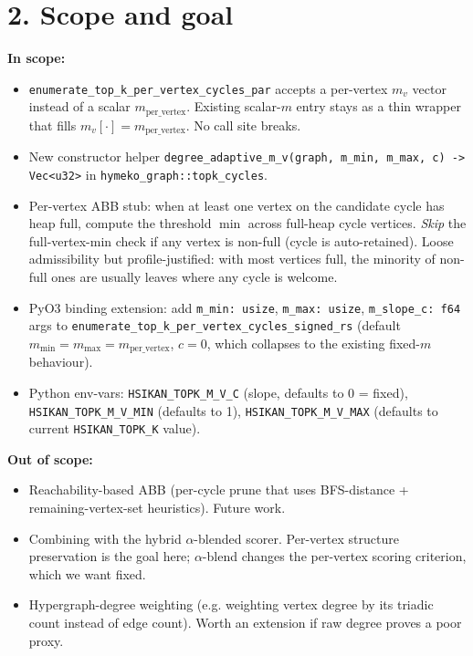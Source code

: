 \documentclass[a4paper,11pt]{article}
\begin{document}
\section*{2. Scope and goal}

\textbf{In scope:}

\begin{itemize}
  \item \texttt{enumerate\_top\_k\_per\_vertex\_cycles\_par} accepts
    a per-vertex $m_v$ vector instead of a scalar
    $m_\text{per\_vertex}$.  Existing scalar-$m$ entry stays as a
    thin wrapper that fills $m_v[\cdot] = m_\text{per\_vertex}$.
    No call site breaks.
  \item New constructor helper
    \texttt{degree\_adaptive\_m\_v(graph, m\_min, m\_max, c) -> Vec<u32>}
    in \texttt{hymeko\_graph::topk\_cycles}.
  \item Per-vertex ABB stub: when at least one vertex on the
    candidate cycle has heap full, compute the threshold
    $\min$ across full-heap cycle vertices.  \emph{Skip} the
    full-vertex-min check if any vertex is non-full (cycle is
    auto-retained).  Loose admissibility but profile-justified: with
    most vertices full, the minority of non-full ones are usually
    leaves where any cycle is welcome.
  \item PyO3 binding extension: add \texttt{m\_min: usize},
    \texttt{m\_max: usize}, \texttt{m\_slope\_c: f64} args to
    \texttt{enumerate\_top\_k\_per\_vertex\_cycles\_signed\_rs}
    (default $m_\text{min} = m_\text{max} = m_\text{per\_vertex}$,
    $c = 0$, which collapses to the existing fixed-$m$ behaviour).
  \item Python env-vars:
    \texttt{HSIKAN\_TOPK\_M\_V\_C} (slope, defaults to 0 = fixed),
    \texttt{HSIKAN\_TOPK\_M\_V\_MIN} (defaults to 1),
    \texttt{HSIKAN\_TOPK\_M\_V\_MAX} (defaults to current
    \texttt{HSIKAN\_TOPK\_K} value).
\end{itemize}

\textbf{Out of scope:}

\begin{itemize}
  \item Reachability-based ABB (per-cycle prune that uses BFS-distance
    + remaining-vertex-set heuristics).  Future work.
  \item Combining with the hybrid $\alpha$-blended scorer.  Per-vertex
    structure preservation is the goal here; $\alpha$-blend changes
    the per-vertex scoring criterion, which we want fixed.
  \item Hypergraph-degree weighting (e.g. weighting vertex degree by
    its triadic count instead of edge count).  Worth an extension if
    raw degree proves a poor proxy.
\end{itemize}
\end{document}

